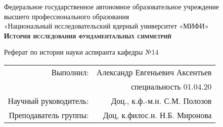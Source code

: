 
\begin{titlepage}
	\begin{center}
		
		{Федеральное государственное автономное образовательное учреждение\\			
			высшего профессионального образования\\		
			«Национальный исследовательский ядерный университет «МИФИ»} \\[2.4cm]
		
		
		
		\textsc{\textbf{История исследования фундаментальных симметрий} \\[2.4cm] }
		
		
	\end{center}
	
	
	\begin{flushright}
		Реферат по истории науки аспиранта кафедры №14
		\begin{tabular}{rr}
			Выполнил: & Александр Евгеньевич Аксентьев \\
			&	специальность 01.04.20 \\					
			Научный руководитель: \underline{\hspace*{3cm}} & Доц., к.ф.-м.н.  С.М. Полозов 	\\
			Преподаватель группы: \underline{\hspace*{3cm}} & Доц, к.филос.н. Н.Б. Миронова
		\end{tabular}
		
	\end{flushright}
	
	\vfill
	
	
	\begin{center}
		\the\year{}
	\end{center}
	
	
	
\end{titlepage}